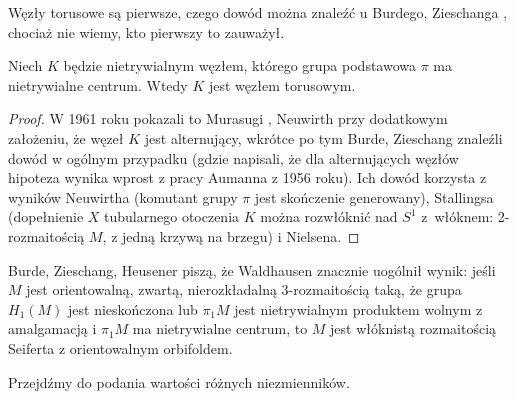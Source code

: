 Węzły torusowe są pierwsze, czego dowód można znaleźć u Burdego, Zieschanga \cite[s. 101]{burde2014}, chociaż nie wiemy, kto pierwszy to zauważył.

\begin{proposition}
\label{prp:torus_nontrivial_center}
    Niech $K$ będzie nietrywialnym węzłem, którego grupa podstawowa $\pi$ ma nietrywialne centrum.
    Wtedy $K$ jest węzłem torusowym.
\end{proposition}

\begin{proof}
%
%
%
%
%
%
    W 1961 roku pokazali to Murasugi \cite{murasugi1961}, Neuwirth \cite{neuwirth1961} przy dodatkowym założeniu, że węzeł $K$ jest alternujący,
    wkrótce po tym Burde, Zieschang znaleźli dowód w ogólnym przypadku \cite{zieschang1966} (gdzie napisali, że dla alternujących węzłów hipoteza wynika wprost z pracy Aumanna \cite{aumann1956} z 1956 roku).
    Ich dowód korzysta z wyników Neuwirtha (komutant grupy $\pi$ jest skończenie generowany), Stallingsa (dopełnienie $X$ tubularnego otoczenia $K$ można rozwłóknić nad $S^1$ z~włóknem: 2-rozmaitością $M$, z jedną krzywą na brzegu) i Nielsena.
\end{proof}

Burde, Zieschang, Heusener \cite[s. 85]{burde2014} piszą, że Waldhausen
%
znacznie uogólnił wynik: jeśli $M$ jest orientowalną, zwartą, nierozkładalną 3-rozmaitością taką, że grupa $H_1(M)$ jest nieskończona lub $\pi_1 M$ jest nietrywialnym produktem wolnym z amalgamacją i $\pi_1 M $ ma nietrywialne centrum, to $M$ jest włóknistą rozmaitością Seiferta z orientowalnym orbifoldem.
%

Przejdźmy do podania wartości różnych niezmienników.





%


